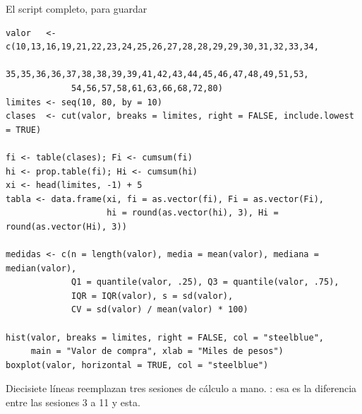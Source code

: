 \documentclass[aspectratio=169,10pt]{beamer}
\begin{document}
\begin{frame}[fragile]{El script completo, para guardar}
  \footnotesize
\begin{lstlisting}[style=Rmini]
valor   <- c(10,13,16,19,21,22,23,24,25,26,27,28,28,29,29,30,31,32,33,34,
             35,35,36,36,37,38,38,39,39,41,42,43,44,45,46,47,48,49,51,53,
             54,56,57,58,61,63,66,68,72,80)
limites <- seq(10, 80, by = 10)
clases  <- cut(valor, breaks = limites, right = FALSE, include.lowest = TRUE)

fi <- table(clases); Fi <- cumsum(fi)
hi <- prop.table(fi); Hi <- cumsum(hi)
xi <- head(limites, -1) + 5
tabla <- data.frame(xi, fi = as.vector(fi), Fi = as.vector(Fi),
                    hi = round(as.vector(hi), 3), Hi = round(as.vector(Hi), 3))

medidas <- c(n = length(valor), media = mean(valor), mediana = median(valor),
             Q1 = quantile(valor, .25), Q3 = quantile(valor, .75),
             IQR = IQR(valor), s = sd(valor),
             CV = sd(valor) / mean(valor) * 100)

hist(valor, breaks = limites, right = FALSE, col = "steelblue",
     main = "Valor de compra", xlab = "Miles de pesos")
boxplot(valor, horizontal = TRUE, col = "steelblue")
\end{lstlisting}

  \vspace{-0.12cm}
  {\tiny\color{uniGris} Diecisiete líneas reemplazan tres sesiones de cálculo a
  mano. :
  esa es la diferencia entre las sesiones 3 a 11 y esta.}
\end{frame}
\end{document}
